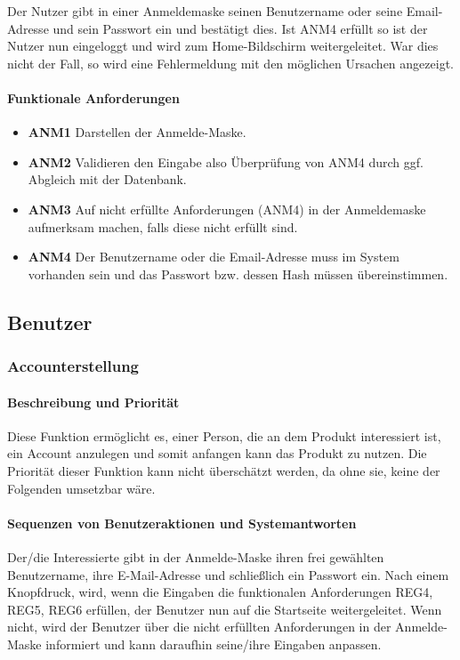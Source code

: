 Der Nutzer gibt in einer Anmeldemaske seinen Benutzername oder seine Email-Adresse und sein Passwort ein und bestätigt dies. Ist ANM4 erfüllt so ist der Nutzer nun eingeloggt und wird zum Home-Bildschirm weitergeleitet. War dies nicht der Fall, so wird eine Fehlermeldung mit den möglichen Ursachen angezeigt.

\paragraph{Funktionale Anforderungen}
\begin{itemize}
	\item \textbf{ANM1} Darstellen der Anmelde-Maske.
	\item \textbf{ANM2} Validieren den Eingabe also Überprüfung von ANM4 durch ggf. Abgleich mit der Datenbank.
	\item \textbf{ANM3} Auf nicht erfüllte Anforderungen (ANM4) in der Anmeldemaske aufmerksam machen, falls diese nicht erfüllt sind.
	\item \textbf{ANM4} Der Benutzername oder die Email-Adresse muss im System vorhanden sein und das Passwort bzw. dessen Hash müssen übereinstimmen.
\end{itemize}

\subsection{Benutzer}
\subsubsection{Accounterstellung}\label{acc}
\paragraph{Beschreibung und Priorität}
Diese Funktion ermöglicht es, einer Person, die an dem Produkt interessiert ist, ein Account anzulegen und somit anfangen kann das Produkt zu nutzen. Die Priorität dieser Funktion kann nicht überschätzt werden, da ohne sie, keine der Folgenden umsetzbar wäre.
\paragraph{Sequenzen von Benutzeraktionen und Systemantworten} Der/die Interessierte gibt in der Anmelde-Maske ihren frei gewählten Benutzername, ihre E-Mail-Adresse und schließlich ein Passwort ein. Nach einem Knopfdruck, wird, wenn die Eingaben die funktionalen Anforderungen REG4, REG5, REG6 erfüllen, der Benutzer nun auf die Startseite weitergeleitet. Wenn nicht, wird der Benutzer über die nicht erfüllten Anforderungen in der Anmelde-Maske informiert und kann daraufhin seine/ihre Eingaben anpassen.

